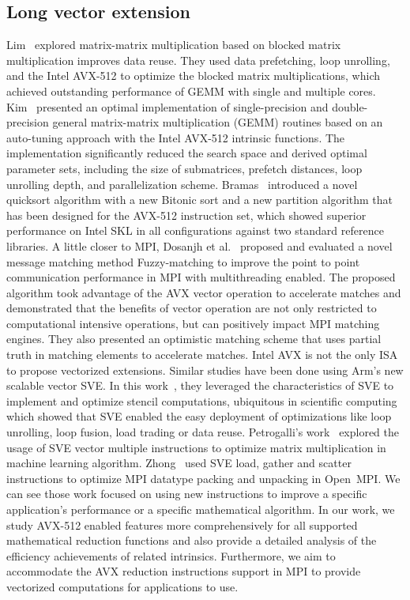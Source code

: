 \documentclass[5p,times,twocolumn]{elsarticle}
\newcommand{\ompi}[0]{Open~MPI\xspace}
\newcommand{\sve}[0]{\textsc{SVE}\xspace}
\begin{document}
\subsection{Long vector extension}
Lim~\cite{Lim2018} explored matrix-matrix multiplication based on blocked matrix multiplication
improves data reuse. They used data prefetching, loop unrolling, and the Intel AVX-512
to optimize the blocked matrix multiplications, which achieved outstanding performance of GEMM
with single and multiple cores.
%
Kim~\cite{Kim19} presented an optimal implementation of single-precision and double-precision general matrix-matrix multiplication (GEMM) routines based on an auto-tuning approach with the Intel AVX-512 intrinsic functions.
The implementation significantly reduced the search space and derived optimal parameter sets, including the size of submatrices, prefetch distances, loop unrolling depth, and parallelization scheme.
%
Bramas~\cite{Bramas2017} introduced a novel quicksort algorithm with a new Bitonic sort and a new
partition algorithm that has been designed for the AVX-512
instruction set, which showed superior performance on Intel SKL in
all configurations against two standard reference libraries.
%
A little closer to MPI, Dosanjh et al.~\cite{tag-match} proposed and evaluated a novel message matching method Fuzzy-matching
to improve the point to point communication performance in MPI with multithreading enabled.
The proposed algorithm took advantage of the AVX vector operation to accelerate matches
and demonstrated that the benefits of vector operation are not only restricted to computational intensive operations, but can positively impact MPI matching engines. They also presented an optimistic
matching scheme that uses partial truth in matching elements
to accelerate matches.
%
Intel AVX is not the only ISA to propose vectorized extensions. Similar studies have been done using Arm's new scalable vector SVE.
In this work~\cite{sve-stencil}, they leveraged the characteristics of \sve to implement and optimize
stencil computations, ubiquitous in scientific computing which showed
that \sve enabled the easy deployment of optimizations like loop unrolling,
loop fusion, load trading or data reuse.
%
Petrogalli's work~\cite{sveml} explored the usage of SVE vector multiple
instructions to optimize matrix multiplication in machine learning algorithm.
%
Zhong~\cite{dongsve} used SVE load, gather and scatter instructions to optimize MPI datatype
packing and unpacking in \ompi.
%
We can see those work focused on using new instructions to improve a specific application's performance or a specific mathematical algorithm.
In our work, we study AVX-512 enabled features more comprehensively for
all supported mathematical reduction functions and also provide
a detailed analysis of the efficiency achievements of related intrinsics.
Furthermore, we aim to accommodate the AVX reduction instructions support in MPI to provide
vectorized computations for applications to use.
\end{document}
